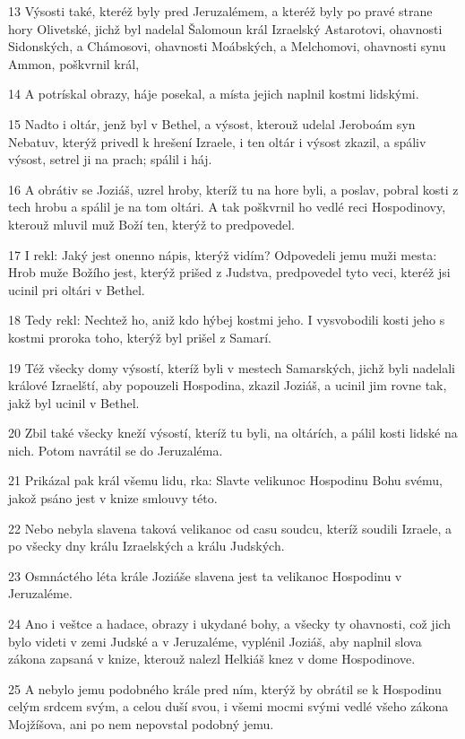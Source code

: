 \par 13 Výsosti také, kteréž byly pred Jeruzalémem, a kteréž byly po pravé strane hory Olivetské, jichž byl nadelal Šalomoun král Izraelský Astarotovi, ohavnosti Sidonských, a Chámosovi, ohavnosti Moábských, a Melchomovi, ohavnosti synu Ammon, poškvrnil král,
\par 14 A potrískal obrazy, háje posekal, a místa jejich naplnil kostmi lidskými.
\par 15 Nadto i oltár, jenž byl v Bethel, a výsost, kterouž udelal Jeroboám syn Nebatuv, kterýž privedl k hrešení Izraele, i ten oltár i výsost zkazil, a spáliv výsost, setrel ji na prach; spálil i háj.
\par 16 A obrátiv se Joziáš, uzrel hroby, kteríž tu na hore byli, a poslav, pobral kosti z tech hrobu a spálil je na tom oltári. A tak poškvrnil ho vedlé reci Hospodinovy, kterouž mluvil muž Boží ten, kterýž to predpovedel.
\par 17 I rekl: Jaký jest onenno nápis, kterýž vidím? Odpovedeli jemu muži mesta: Hrob muže Božího jest, kterýž prišed z Judstva, predpovedel tyto veci, kteréž jsi ucinil pri oltári v Bethel.
\par 18 Tedy rekl: Nechtež ho, aniž kdo hýbej kostmi jeho. I vysvobodili kosti jeho s kostmi proroka toho, kterýž byl prišel z Samarí.
\par 19 Též všecky domy výsostí, kteríž byli v mestech Samarských, jichž byli nadelali králové Izraelští, aby popouzeli Hospodina, zkazil Joziáš, a ucinil jim rovne tak, jakž byl ucinil v Bethel.
\par 20 Zbil také všecky kneží výsostí, kteríž tu byli, na oltárích, a pálil kosti lidské na nich. Potom navrátil se do Jeruzaléma.
\par 21 Prikázal pak král všemu lidu, rka: Slavte velikunoc Hospodinu Bohu svému, jakož psáno jest v knize smlouvy této.
\par 22 Nebo nebyla slavena taková velikanoc od casu soudcu, kteríž soudili Izraele, a po všecky dny králu Izraelských a králu Judských.
\par 23 Osmnáctého léta krále Joziáše slavena jest ta velikanoc Hospodinu v Jeruzaléme.
\par 24 Ano i veštce a hadace, obrazy i ukydané bohy, a všecky ty ohavnosti, což jich bylo videti v zemi Judské a v Jeruzaléme, vyplénil Joziáš, aby naplnil slova zákona zapsaná v knize, kterouž nalezl Helkiáš knez v dome Hospodinove.
\par 25 A nebylo jemu podobného krále pred ním, kterýž by obrátil se k Hospodinu celým srdcem svým, a celou duší svou, i všemi mocmi svými vedlé všeho zákona Mojžíšova, ani po nem nepovstal podobný jemu.
